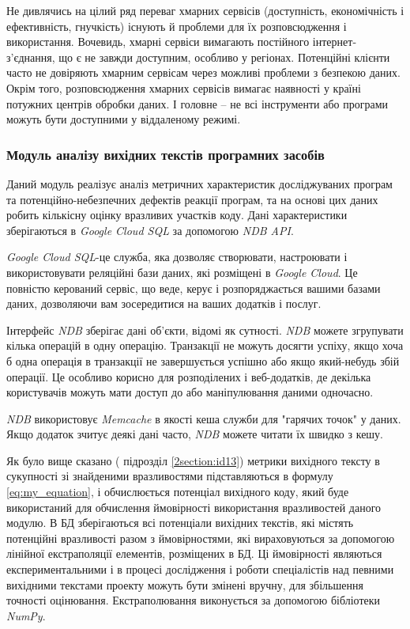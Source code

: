 Не дивлячись на цілий ряд переваг хмарних сервісів (доступність, економічність і ефективність, гнучкість) існують й проблеми для їх розповсюдження і використання. Вочевидь, хмарні сервіси вимагають постійного інтернет-з’єднання, що є не завжди доступним, особливо у регіонах. Потенційні клієнти часто не довіряють хмарним сервісам через можливі проблеми з безпекою даних. Окрім того, розповсюдження хмарних сервісів вимагає наявності у країні потужних центрів обробки даних. І головне – не всі інструменти або програми можуть бути доступними у віддаленому режимі.


\subsubsection{Модуль аналізу вихідних текстів програмних засобів}
\label{module_analize}
Даний модуль реалізує аналіз метричних характеристик досліджуваних програм та потенційно-небезпечних дефектів реакції програм, та на основі цих даних робить кількісну оцінку вразливих участків коду. Дані характеристики зберігаються в {\itshape Google Cloud SQL} за допомогою {\it NDB API}.

{\itshape Google Cloud SQL}-це служба, яка дозволяє створювати, настроювати і використовувати реляційні бази даних, які розміщені в {\itshape Google Cloud}. Це повністю керований сервіс, що веде, керує і розпоряджається вашими базами даних, дозволяючи вам зосередитися на ваших додатків і послуг.

Інтерфейс {\itshape NDB} зберігає дані об'єкти, відомі як сутності.
{\itshape NDB} можете згрупувати кілька операцій в одну операцію. Транзакції не можуть досягти успіху, якщо хоча б одна операція в транзакції не завершується успішно або якщо який-небудь збій операції. Це особливо корисно для розподілених і веб-додатків, де декілька користувачів можуть мати доступ до або маніпулювання даними одночасно.

{\itshape NDB} використовує {\itshape Memcache} в якості кеша служби для "гарячих точок" у даних. Якщо додаток зчитує деякі дані часто, {\itshape NDB} можете читати їх швидко з кешу.

Як було вище сказано ( підрозділ \ref{2section:id13}) метрики вихідного тексту в сукупності зі знайденими вразливостями підставляються в формулу \eqref{eq:my_equation}, і обчислюється потенціал вихідного коду, який буде використаний для обчислення ймовірності використання вразливостей даного модулю.
В БД зберігаються всі потенціали вихідних текстів, які містять потенційні вразливості разом з ймовірностями, які вираховуються за допомогою лінійної екстраполяції елементів, розміщених в БД. Ці ймовірності являються експериментальними і в процесі дослідження і роботи спеціалістів над певними вихідними текстами проекту можуть бути змінені вручну, для збільшення точності оцінювання.
Екстраполювання виконується за допомогою бібліотеки {\it NumPy}.

